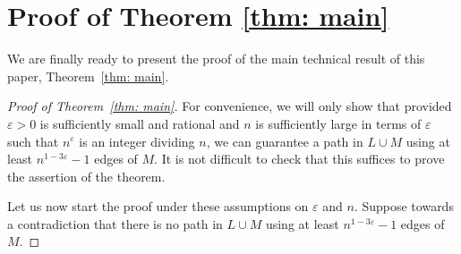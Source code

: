 \documentclass[11pt,reqno]{article}
\begin{document}
\section{Proof of Theorem \ref{thm: main}}\label{sec:thm}
We are finally ready to present the proof of the main technical result of this paper, Theorem~\ref{thm: main}.
 \begin{proof}[Proof of Theorem~\ref{thm: main}]

For convenience, we will only show that provided $\varepsilon>0$ is sufficiently small and rational and $n$ is sufficiently large in terms of $\varepsilon$ such that $n^\varepsilon$ is an integer dividing $n$, we can guarantee a path in $L\cup M$ using at least $n^{1-3\varepsilon}-1$ edges of $M$. It is not difficult to check that this suffices to prove the assertion of the theorem.

Let us now start the proof under these assumptions on $\varepsilon$ and $n$. Suppose towards a contradiction that there is no path in $L\cup M$ using at least $n^{1-3\varepsilon}-1$ edges of $M$.


\end{proof}
\end{document}

